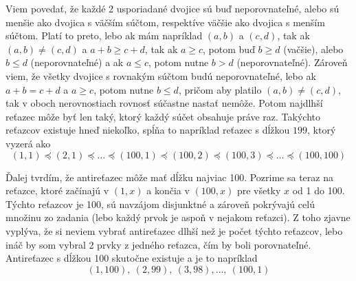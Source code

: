 
Viem povedať, že každé 2 usporiadané dvojice sú buď neporovnateľné, 
alebo sú menšie ako dvojica s väčším súčtom, respektíve väčšie ako 
dvojica s menším súčtom. Platí to preto, lebo ak mám napríklad $(a,b)$ 
a $(c,d)$, tak ak $(a,b)\neq (c,d)$ a $a+b\geq c+d$, tak ak $a\geq c$, 
potom buď $b\geq d$ (vačšie), alebo $b\leq d$ (neporovnateľné) a ak 
$a\leq c$, potom nutne $b>d$ (neporovnateľné). Zároveň viem, že všetky 
dvojice s rovnakým súčtom budú neporovnateľné, lebo ak $a+b=c+d$ a 
$a\geq c$, potom nutne $b\leq d$, pričom aby platilo $(a,b)\neq (c,d)$, 
tak v oboch nerovnostiach rovnosť súčastne nastať nemôže. Potom 
najdlhší reťazec môže byť len taký, ktorý každý súčet obsahuje práve 
raz. Takýchto reťazcov existuje hneď niekoľko, spĺňa to napríklad 
reťazec s dĺžkou $199$, ktorý vyzerá ako
$$(1,1)\preceq (2,1)\preceq\dots\preceq (100,1)
\preceq (100,2)\preceq (100,3)\preceq\dots\preceq (100,100)$$

Ďalej tvrdím, že antireťazec môže mať dĺžku najviac 100. Pozrime sa 
teraz na reťazce, ktoré začínajú v $(1,x)$ a končia v $(100,x)$ pre 
všetky $x$ od 1 do 100. Týchto reťazcov je 100, sú navzájom disjunktné 
a zároveň pokrývajú celú množinu zo zadania (lebo každý prvok je 
aspoň v nejakom reťazci). Z toho zjavne vyplýva, že si neviem vybrať 
antireťazec dlhší než je počet týchto reťazcov, lebo ináč by som 
vybral 2 prvky z jedného reťazca, čím by boli porovnateľné. 
Antireťazec s dĺžkou 100 skutočne existuje a je to napríklad 
$$(1,100),\ (2,99),\ (3,98),\dots,\ (100,1)$$

